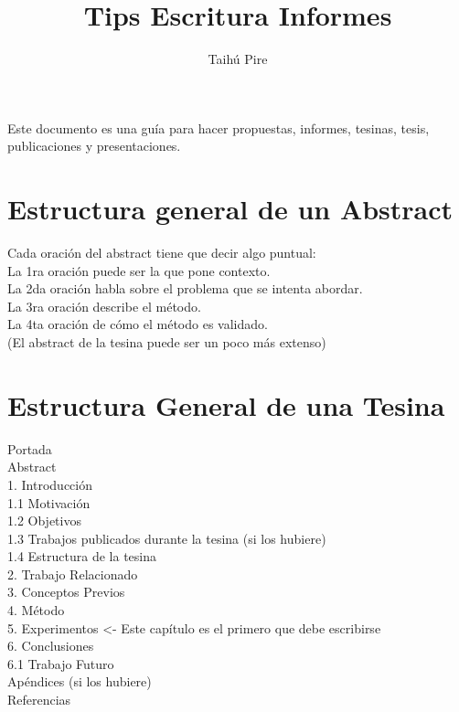 \documentclass[a4paper,	11pt]{article}
\begin{document}
\renewcommand\floatpagefraction{.9}
\renewcommand\topfraction{.9}
\renewcommand\bottomfraction{.9}
\renewcommand\textfraction{.1}
\setcounter{totalnumber}{50}
\setcounter{topnumber}{50}
\setcounter{bottomnumber}{50}

\title{Tips Escritura Informes}
\author{Taihú Pire}


\tableofcontents

\maketitle


Este documento es una guía para hacer propuestas, informes, tesinas, tesis, publicaciones y presentaciones.

\section{Estructura general de un Abstract}
Cada oración del abstract tiene que decir algo puntual:\\
La 1ra oración puede ser la que pone contexto.\\
La 2da oración habla sobre el problema que se intenta abordar.\\
La 3ra oración describe el método.\\
La 4ta oración de cómo el método es validado.\\
(El abstract de la tesina puede ser un poco más extenso)

\section{Estructura General de una Tesina}
Portada\\
Abstract\\
1. Introducción\\
1.1 Motivación\\
1.2 Objetivos\\
1.3 Trabajos publicados durante la tesina (si los hubiere)\\
1.4 Estructura de la tesina\\
2. Trabajo Relacionado\\
3. Conceptos Previos\\
4. Método\\
5. Experimentos <- Este capítulo es el primero que debe escribirse\\
6. Conclusiones\\
6.1 Trabajo Futuro\\
Apéndices (si los hubiere)\\
Referencias
\end{document}
